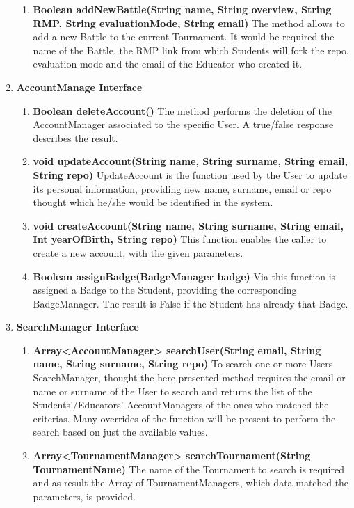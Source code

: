 \begin{enumerate}
\begin{enumerate}[label=$\bullet$]
        \item \textbf{Boolean addNewBattle(String name, String overview, String RMP, String evaluationMode, String email)} The method allows to add a new Battle to the current Tournament. It would be required the name of the Battle, the RMP link from which Students will fork the repo, evaluation mode and the email of the Educator who created it.
        \end{enumerate}
    \item \textbf{AccountManage Interface} 
        \begin{enumerate}[label=$\bullet$]
            \item \textbf{Boolean deleteAccount()} The method performs the deletion of the AccountManager associated to the specific User. A true/false response describes the result.
            \item \textbf{void updateAccount(String name, String surname, String email, String repo)} UpdateAccount is the function used by the User to update its personal information, providing new name, surname, email or repo thought which he/she would be identified in the system.
            \item \textbf{void createAccount(String name, String surname, String email, Int yearOfBirth, String repo)} This function enables the caller to create a new account, with the given parameters.
            \item \textbf{Boolean assignBadge(BadgeManager badge)} Via this function is assigned a Badge to the Student, providing the corresponding BadgeManager. The result is False if the Student has already that Badge.
        \end{enumerate}
    \item \textbf{SearchManager Interface} 
        \begin{enumerate}[label=$\bullet$]
            \item \textbf{Array<AccountManager> searchUser(String email, String name, String surname, String repo)} To search one or more Users SearchManager, thought the here presented method requires the email or name or surname of the User to search and returns the list of the Students'/Educators' AccountManagers of the ones who matched the criterias. Many overrides of the function will be present to perform the search based on just the available values.
            \item \textbf{Array<TournamentManager> searchTournament(String TournamentName)} The name of the Tournament to search is required and as result the Array of TournamentManagers, which data matched the parameters, is provided.

\end{enumerate}
\end{enumerate}
